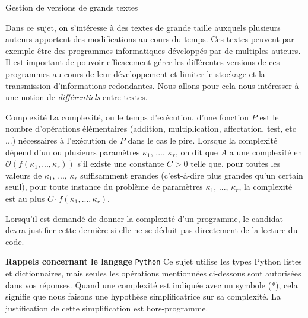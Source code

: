Gestion de versions de grands textes 

Dans ce sujet, on s'intéresse à des textes de grande taille auxquels plusieurs auteurs apportent
des modifications au cours du temps. Ces textes peuvent par exemple être des programmes
informatiques développés par de multiples auteurs. Il est important de pouvoir efficacement
gérer les différentes versions de ces programmes au cours de leur développement et limiter le
stockage et la transmission d'informations redondantes. Nous allons pour cela nous intéresser à
une notion de \textit{différentiels} entre textes. 

\begin{defi}{Complexité}
La complexité, ou le temps d'exécution, d'une fonction $P$ est le nombre d'opérations élémentaires (addition, multiplication, affectation, test, etc ...) nécessaires à l'exécution
de $P$ dans le cas le pire. Lorsque la complexité dépend d'un ou plusieurs paramètres $\kappa_1$, ..., $\kappa_r$, on dit que $A$ a une complexité en $\mathcal{O}\left( f \left(\kappa_1, ..., \kappa_r  \right)\right)$ s'il existe une constante $C > 0$ telle que,
pour toutes les valeurs de $\kappa_1$, ..., $\kappa_r$ suffisamment grandes (c'est-à-dire plus grandes qu'un certain seuil), pour toute instance du problème de paramètres $\kappa_1$, ..., $\kappa_r$, la complexité est au plus
$C \cdot f \left(\kappa_1, ..., \kappa_r  \right)$.
\end{defi}

Lorsqu'il est demandé de donner la complexité d'un programme, le candidat devra justifier
cette dernière si elle ne se déduit pas directement de la lecture du code. 

\vspace{.5cm}

\textbf{Rappels concernant le langage}  \texttt{Python}
Ce sujet utilise les types Python listes et dictionnaires, mais seules les opérations mentionnées ci-dessous sont autorisées dans vos réponses. Quand une complexité est indiquée avec un symbole (*), cela signifie que nous faisons une hypothèse
simplificatrice sur sa complexité. La justification de cette simplification est hors-programme. 

